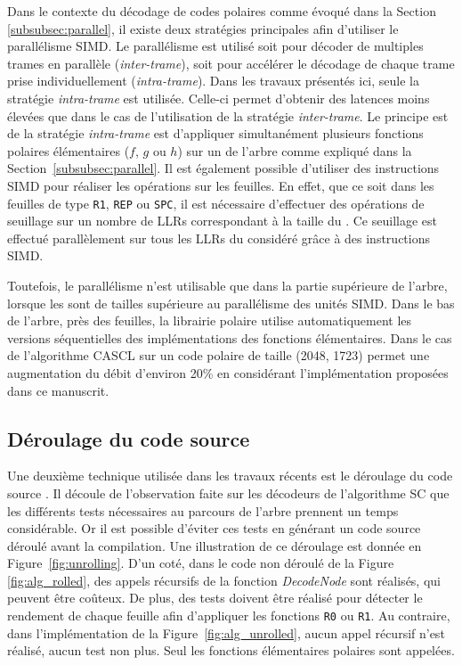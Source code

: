 Dans le contexte du décodage de codes polaires comme évoqué dans la Section \ref{subsubsec:parallel}, il existe deux stratégies principales afin d'utiliser le parallélisme SIMD. Le parallélisme est utilisé soit pour décoder de multiples trames en parallèle (\textit{inter-trame}), soit pour accélérer le décodage de chaque trame prise individuellement (\textit{intra-trame}). Dans les travaux présentés ici, seule la stratégie \textit{intra-trame} est utilisée. Celle-ci permet d'obtenir des latences moins élevées que dans le cas de l'utilisation de la stratégie \textit{inter-trame}. Le principe est de la stratégie \textit{intra-trame} est d'appliquer simultanément plusieurs fonctions polaires élémentaires ($f$, $g$ ou $h$) sur un \noeud de l'arbre comme expliqué dans la Section~\ref{subsubsec:parallel}. Il est également possible d'utiliser des instructions SIMD pour réaliser les opérations sur les feuilles. En effet, que ce soit dans les feuilles de type \texttt{R1}, \texttt{REP} ou \texttt{SPC}, il est nécessaire d'effectuer des opérations de seuillage sur un nombre de LLRs correspondant à la taille du \noeud. Ce seuillage est effectué parallèlement sur tous les LLRs du \noeud considéré grâce à des instructions SIMD.

Toutefois, le parallélisme n'est utilisable que dans la partie supérieure de l'arbre, lorsque les \noeuds sont de tailles supérieure au parallélisme des unités SIMD. Dans le bas de l'arbre, près des feuilles, la librairie polaire \cite{cassagne_efficient_2015} utilise automatiquement les versions séquentielles des implémentations des fonctions élémentaires. Dans le cas de l'algorithme CASCL sur un code polaire de taille (2048, 1723) permet une augmentation du débit d'environ 20\% en considérant l'implémentation proposées dans ce manuscrit.


\subsection{Déroulage du code source}
\label{subsec:unroll}
Une deuxième technique utilisée dans les travaux récents est le déroulage du code source \cite{sarkis_autogenerating_2014,giard_fast_2014,cassagne_efficient_2015,cassagne_energy_2016}. Il découle de l'observation faite sur les décodeurs de l'algorithme SC que les différents tests nécessaires au parcours de l'arbre prennent un temps considérable. Or il est possible d'éviter ces tests en générant un code source déroulé avant la compilation. Une illustration de ce déroulage est donnée en Figure~\ref{fig:unrolling}. D'un coté, dans le code non déroulé de la Figure \ref{fig:alg_rolled}, des appels récursifs de la fonction \textit{DecodeNode} sont réalisés, qui peuvent être coûteux. De plus, des tests doivent être réalisé pour détecter le rendement de chaque feuille afin d'appliquer les fonctions \texttt{R0} ou \texttt{R1}. Au contraire, dans l'implémentation de la Figure~\ref{fig:alg_unrolled}, aucun appel récursif n'est réalisé, aucun test non plus. Seul les fonctions élémentaires polaires sont appelées.

